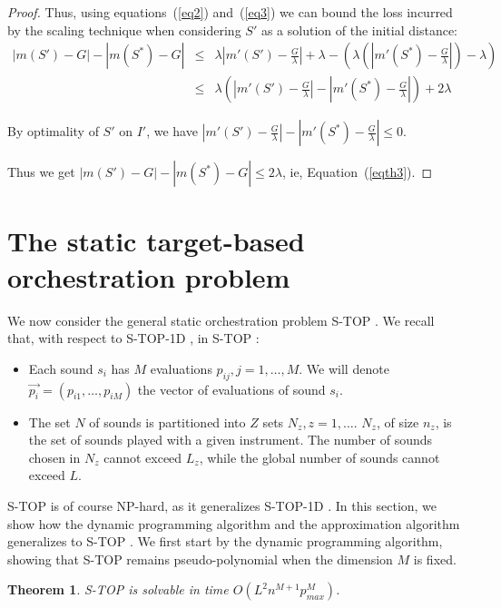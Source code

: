 \documentclass[a4paper]{book}
\newtheorem{theorem}{Theorem}[chapter]
\newtheorem{proof}{\noindent{\bf Proof.} }
\newcommand{\stat}{{\sc S-TOP }}
\newcommand{\statoned}{{\sc S-TOP-1D }}
\begin{document}
\begin{proof}
Thus, using equations~(\ref{eq2}) and~(\ref{eq3}) we can bound the loss incurred by the scaling technique when considering $S'$ as a solution of the initial distance:
\begin{eqnarray}
|m(S')-G|-|m(S^*)-G| & \leq & \lambda \left|m'(S') - \frac{G}{\lambda}\right| + \lambda - ( \lambda( \left|m'(S^*)-\frac{G}{\lambda}\right|) - \lambda) \\
& \leq  & \lambda (\left|m'(S') - \frac{G}{\lambda}\right| - \left|m'(S^*)-\frac{G}{\lambda}\right|) + 2\lambda \label{eq:bound}
\end{eqnarray}

By optimality of $S'$ on $I'$, we have
$|m'(S') - \frac{G}{\lambda}| - |m'(S^*)-\frac{G}{\lambda}| \leq 0$. 

Thus we get $|m(S')-G|-|m(S^*)-G| \leq 2\lambda$, ie, Equation~(\ref{eqth3}).
\end{proof}



\section{The static target-based orchestration problem}\label{sec:static}

We now consider the general static orchestration problem \stat. We recall that, with respect to \statoned, in \stat:
\begin{itemize}
    \item Each sound $s_i$ has $M$ evaluations $p_{ij},j=1,\dots,M$. We will denote $\vec{p_i}=(p_{i1},\dots,p_{iM})$ the vector of evaluations of sound $s_i$.
    \item The set $N$ of sounds is partitioned into $Z$ sets $N_z,z=1,\dots$. $N_z$, of size $n_z$, is the set of sounds played with a given instrument. The number of sounds chosen in $N_z$ cannot exceed $L_z$, while the global number of sounds cannot exceed $L$. 
\end{itemize}

\stat is of course NP-hard, as it generalizes \statoned. In this section, we show how the dynamic programming algorithm and the approximation algorithm generalizes to \stat. 
We first start by the dynamic programming algorithm, showing that \stat remains pseudo-polynomial when the dimension $M$ is fixed. 


\begin{theorem}\label{th:generalstatic}
\stat is solvable in time $O(L^2n^{M+1}p_{max}^M)$.
\end{theorem}
\end{document}
